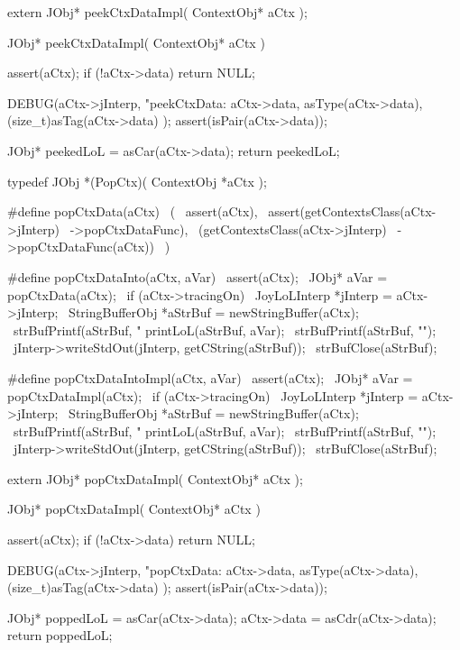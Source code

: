 \startCHeader
extern JObj* peekCtxDataImpl(
  ContextObj* aCtx
);
\stopCHeader
{}

\startCCode
JObj* peekCtxDataImpl(
  ContextObj* aCtx
) {
  assert(aCtx);
  if (!aCtx->data) return NULL;

  DEBUG(aCtx->jInterp, "peekCtxData: %
    aCtx->data, asType(aCtx->data), (size_t)asTag(aCtx->data)
  );
  assert(isPair(aCtx->data));
  
  JObj* peekedLoL = asCar(aCtx->data);
  return peekedLoL;
}
\stopCCode

\startCHeader
typedef JObj *(PopCtx)(
  ContextObj *aCtx
);

#define popCtxData(aCtx)                    \
  (                                         \
    assert(aCtx),                           \
    assert(getContextsClass(aCtx->jInterp)  \
      ->popCtxDataFunc),                    \
    (getContextsClass(aCtx->jInterp)        \
      ->popCtxDataFunc(aCtx))               \
  )

#define popCtxDataInto(aCtx, aVar)                    \
assert(aCtx);                                         \
JObj* aVar = popCtxData(aCtx);                        \
if (aCtx->tracingOn) {                                \
  JoyLoLInterp *jInterp = aCtx->jInterp;              \
  StringBufferObj *aStrBuf = newStringBuffer(aCtx);   \
  strBufPrintf(aStrBuf, "%
  printLoL(aStrBuf, aVar);                            \
  strBufPrintf(aStrBuf, "\n");                        \
  jInterp->writeStdOut(jInterp, getCString(aStrBuf)); \
  strBufClose(aStrBuf);                               \
}

#define popCtxDataIntoImpl(aCtx, aVar)                \
assert(aCtx);                                         \
JObj* aVar = popCtxDataImpl(aCtx);                    \
if (aCtx->tracingOn) {                                \
  JoyLoLInterp *jInterp = aCtx->jInterp;              \
  StringBufferObj *aStrBuf = newStringBuffer(aCtx);   \
  strBufPrintf(aStrBuf, "%
  printLoL(aStrBuf, aVar);                            \
  strBufPrintf(aStrBuf, "\n");                        \
  jInterp->writeStdOut(jInterp, getCString(aStrBuf)); \
  strBufClose(aStrBuf);                               \
}
\stopCHeader

\setCHeaderStream{private}
\startCHeader
extern JObj* popCtxDataImpl(
  ContextObj* aCtx
);
\stopCHeader
\setCHeaderStream{public}

\startCCode
JObj* popCtxDataImpl(
  ContextObj* aCtx
) {
  assert(aCtx);
  if (!aCtx->data) return NULL;

  DEBUG(aCtx->jInterp, "popCtxData: %
    aCtx->data, asType(aCtx->data), (size_t)asTag(aCtx->data)
  );
  assert(isPair(aCtx->data));
  
  JObj* poppedLoL = asCar(aCtx->data);
  aCtx->data      = asCdr(aCtx->data);
  return poppedLoL;
}
\stopCCode

